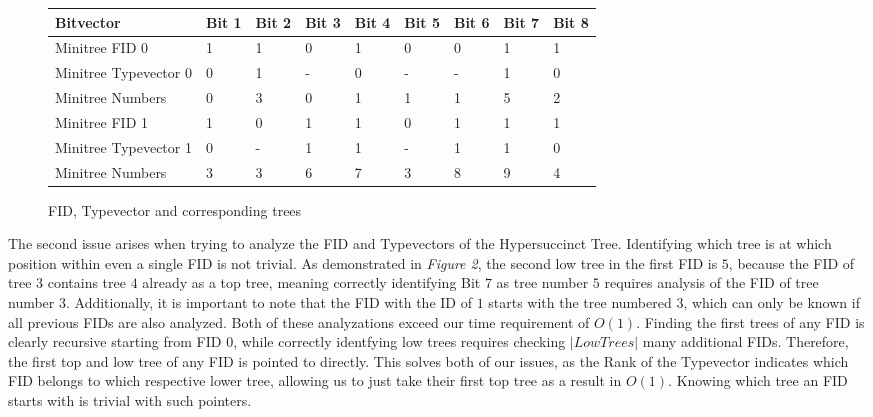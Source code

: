 \documentclass{article}
\begin{document}
\begin{figure}[h]
	\begin{tabular}{ |p{3.5cm}||p{1cm}|p{1cm}|p{1cm}|p{1cm}|p{1cm}|p{1cm}|p{1cm}|p{1cm}|  }
		 \hline
		 Bitvector & Bit 1 &Bit 2&Bit 3&Bit 4& Bit 5 &Bit 6&Bit 7&Bit 8\\
		 \hline
		 Minitree FID 0 & 1 & 1& 0 & 1 & 0 & 0 & 1 & 1\\
		 Minitree Typevector 0& 0 & 1 & - & 0 & - & - & 1 & 0\\
		 Minitree Numbers & 0 & 3 &  0 & 1 & 1 & 1 & 5 & 2\\
		 \hline
		 Minitree FID 1 & 1 & 0& 1 & 1 & 0 & 1 & 1 & 1\\
		 Minitree Typevector 1& 0 & - & 1 & 1 & - & 1 & 1 & 0\\
		 Minitree Numbers & 3 & 3 &  6 & 7 & 3 & 8 & 9 & 4\\
		 \hline
	\end{tabular}
\caption{FID, Typevector and corresponding trees}
\label{fid:table2}
\end{figure}
The second issue arises when trying to analyze the FID and Typevectors of the Hypersuccinct Tree. Identifying which tree is at which position within even a single FID is not trivial. As demonstrated in \textit{Figure 2}, the second low tree in the first FID is $5$, because the FID of tree $3$ contains tree $4$ already as a top tree, meaning correctly identifying Bit $7$ as tree number $5$ requires analysis of the FID of tree number $3$. Additionally, it is important to note that the FID with the ID of $1$ starts with the tree numbered $3$, which can only be known if all previous FIDs are also analyzed. Both of these analyzations exceed our time requirement of $O(1)$. Finding the first trees of any FID is clearly recursive starting from FID $0$, while correctly identfying low trees requires checking $|Low Trees|$ many additional FIDs. Therefore, the first top and low tree of any FID is pointed to directly.
This solves both of our issues, as the Rank of the Typevector indicates which FID belongs to which respective lower tree, allowing us to just take their first top tree as a result in $O(1)$. Knowing which tree an FID starts with is trivial with such pointers.
\end{document}
